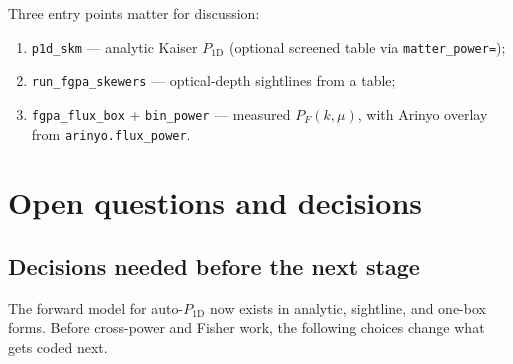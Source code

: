 \documentclass[11pt]{article}
\begin{document}
Three entry points matter for discussion:
\begin{enumerate}
\item \texttt{p1d\_skm} --- analytic Kaiser $P_{1\mathrm{D}}$ (optional screened table via \texttt{matter\_power=});
\item \texttt{run\_fgpa\_skewers} --- optical-depth sightlines from a table;
\item \texttt{fgpa\_flux\_box} + \texttt{bin\_power} --- measured $P_F(k,\mu)$, with Arinyo overlay from \texttt{arinyo.flux\_power}.
\end{enumerate}

\section{Open questions and decisions}

\subsection{Decisions needed before the next stage}

The forward model for auto-$P_{1\mathrm{D}}$ now exists in analytic, sightline, and one-box forms.
Before cross-power and Fisher work, the following choices change what gets coded next.
\end{document}
